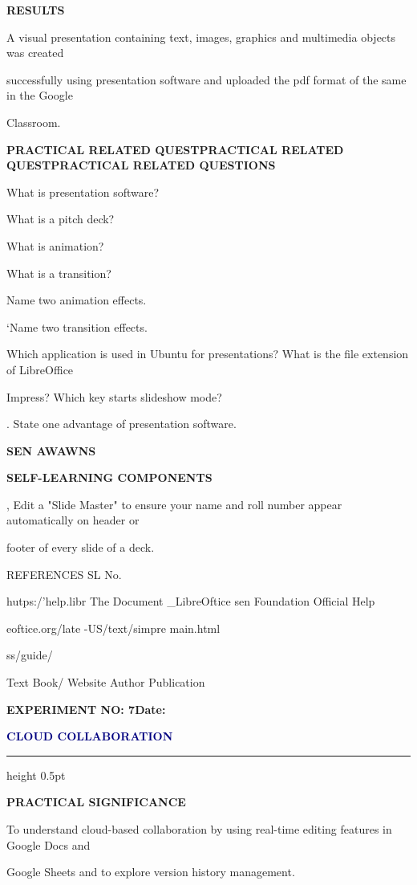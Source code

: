 \documentclass[10pt,a4paper]{article}
\newcommand{\expheading}[2]{%
  \vspace{0.1cm}\noindent\textbf{\large EXPERIMENT NO: #1}\hfill\textbf{Date: #2}\par
}
\newcommand{\exptitle}[1]{%
  \begin{center}\vspace{-2mm}\textcolor{navy}{\fontsize{20}{22}\selectfont\bfseries #1}\end{center}
  \vspace{1mm}\hrule height 0.5pt\vspace{3mm}
}
\begin{document}
\medskip\noindent\textbf{RESULTS}\par
\noindent A visual presentation containing text, images, graphics and multimedia objects was created\par
\noindent successfully using presentation software and uploaded the pdf format of the same in the Google\par
\noindent Classroom.\par
\medskip\noindent\textbf{PRACTICAL RELATED QUESTPRACTICAL RELATED QUESTPRACTICAL RELATED QUESTIONS}\par
\noindent What is presentation software?\par
\noindent What is a pitch deck?\par
\noindent What is animation?\par
\noindent What is a transition?\par
\noindent Name two animation effects.\par
\clearpage
\noindent ‘Name two transition effects.\par
\noindent Which application is used in Ubuntu for presentations? What is the file extension of LibreOffice\par
\noindent Impress? Which key starts slideshow mode?\par
{}. State one advantage of presentation software.\par
\medskip\noindent\textbf{SEN AWAWNS}\par

\medskip\noindent\textbf{SELF-LEARNING COMPONENTS}\par
{}, Edit a "Slide Master" to ensure your name and roll number appear automatically on header or\par
\noindent footer of every slide of a deck.\par
\noindent REFERENCES SL No.\par

                  hutps:/’help.libr   The Document   \_LibreOftice sen   Foundation   Official Help\par
\noindent eoftice.org/late                   -US/text/simpre                 main.html\par
\noindent ss/guide/\par

\noindent Text Book/ Website Author Publication\par
\clearpage
\expheading{7}{\underline{\hspace{1.8cm}}}
\exptitle{CLOUD COLLABORATION}
\medskip\noindent\textbf{PRACTICAL SIGNIFICANCE}\par
\noindent To understand cloud-based collaboration by using real-time editing features in Google Docs and\par
\noindent Google Sheets and to explore version history management.\par
\end{document}
